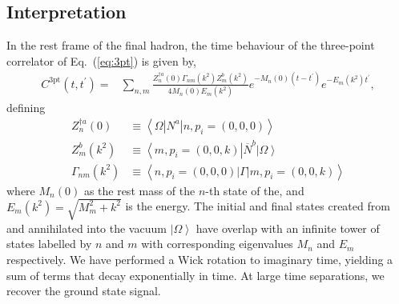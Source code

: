 \documentclass{PoS}
\begin{document}
\subsection{Interpretation}
In the rest frame of the final hadron, the time behaviour of the three-point correlator of Eq.~(\ref{eq:3pt}) is given by,
\begin{align}
C^{\text{3pt}}(t, t^\prime)  = & \sum_{n,m} \frac{Z_n^{\dagger a}(0) \Gamma_{nm}(k^2)Z_m^b(k^2)}{4 M_n(0) E_m(k^2)} e^{-M_n(0)(t - t^\prime)} e^{-E_m(k^2) t^\prime} \label{eq:3ptfit},
\end{align}
defining
\begin{align}
Z_n^{\dagger a}(0) &\equiv\left<\Omega | N^a | n, p_i=\left(0, 0, 0\right) \right>
\\
Z_m^b(k^2) &\equiv \left<m, p_i=\left(0,0,k\right)\right| \overline{N}^b\left|\Omega\right>\\
\Gamma_{nm}(k^2) &\equiv \left<n,p_i=\left(0,0,0\right)| \Gamma | m, p_i=\left(0,0,k\right) \right>
\end{align}
where $M_n(0)$ as the rest mass of the $n$-th state of the, and $E_m(k^2) = \sqrt{M_m^2+k^2}$ is the energy. The initial and final states created from and annihilated into the vacuum $\left|\Omega\right>$ have overlap with an infinite tower of states labelled by $n$ and $m$ with corresponding eigenvalues $M_n$ and $E_m$ respectively. We have performed a Wick rotation to imaginary time, yielding a sum of terms that decay exponentially in time. At large time separations, we recover the ground state signal.
\end{document}
